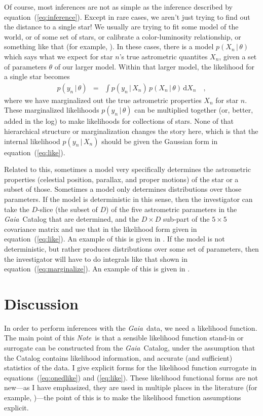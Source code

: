 \documentclass[12pt, modern]{aastex62}
\newcommand{\Gaia}{\textsl{Gaia}}
\newcommand{\documentname}{\textsl{Note}}
\newcommand{\equationname}{equation}
\newcommand{\dd}{\mathrm{d}}
\newcommand{\given}{\,|\,}
\begin{document}
Of course, most inferences are not as simple as the inference described by
\equationname~(\ref{eq:inference}).
Except in rare cases, we aren't just trying to find out the distance to a single
star!
We usually are trying to fit some model of the world, or of some set of stars,
or calibrate a color-luminosity relationship, or something like that
(for example, \citealt{sesar, hawkins, leistedt, oh, anderson}).
In these cases, there is a model $p(X_n\given\theta)$ which says what we expect
for star $n$'s true astrometric quantites $X_n$, given a set of parameters $\theta$
of our larger model.
Within that larger model, the likelihood for a single star becomes
\begin{eqnarray}
p(y_n\given\theta) &=& \int p(y_n\given X_n)\,p(X_n\given\theta)\,\dd X_n
\label{eq:marginalize}
\quad ,
\end{eqnarray}
where we have marginalized out the true astrometric properties $X_n$ for star $n$.
These marginalized likelihoods $p(y_n\given\theta)$
can be multiplied together (or, better, added in the log)
to make likelihoods for collections of stars.
None of that hierarchical structure or marginalization changes the story here,
which is that the internal likelihood $p(y_n\given X_n)$ should be given the
Gaussian form in \equationname~(\ref{eq:like}).

Related to this, sometimes a model very specifically determines the
astrometric properties (celestial position, parallax, and proper
motions) of the star or a subset of those. Sometimes a model only
determines distributions over those parameters.
If the model is deterministic in this sense, then the investigator can take
the $D$-slice (the subset of $D$) of the five astrometric parameters
in the \Gaia\ Catalog that are determined,
and the $D\times D$ sub-part of the $5\times 5$ covariance matrix
and use that in the likelihood form given in \equationname~(\ref{eq:like}).
An example of this is given in \citet{tri2}.
If the model is not deterministic, but rather produces distributions
over some set of parameters, then the investigator will have to do integrals
like that shown in \equationname~(\ref{eq:marginalize}).
An example of this is given in \citet{oh}.

\section{Discussion}
In order to perform inferences
with the \Gaia\ data, we need a likelihood function.
The main point of this \documentname\ is that a sensible likelihood function
stand-in or surrogate can be constructed from the \Gaia\ Catalog, under the assumption
that the Catalog contains likelihood information, and accurate (and sufficient)
statistics of the data.
I give explicit forms for the likelihood function surrogate in
\equationname s~(\ref{eq:onedlike}) and (\ref{eq:like}).
These likelihood functional forms are not new---as I have emphasized,
they are used in multiple places
in the literature (for example, \citealt{tri2, leistedt, oh})---the point of
this is to make the
likelihood function assumptions explicit.
\end{document}
